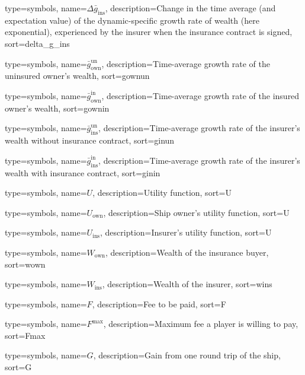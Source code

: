 {
 type={symbols}, 
 name={\ensuremath{\Delta \bar{g}_{\text{ins}}}},
 description={Change in the time average (and expectation value) of the dynamic-specific growth rate of wealth (here exponential), experienced by the insurer when the insurance contract is signed},
 sort=delta_g_ins
}

{
  type={symbols}, 
  name={\ensuremath{\bar{g}_{\text{own}}^{\text{un}}}},
  description={Time-average growth rate of the uninsured owner's wealth},
  sort=gownun
}

{
  type={symbols}, 
  name={\ensuremath{\bar{g}_{\text{own}}^{\text{in}}}},
  description={Time-average growth rate of the insured owner's wealth},
  sort=gownin
}


{
  type={symbols}, 
  name={\ensuremath{\bar{g}_{\text{ins}}^{\text{un}}}},
  description={Time-average growth rate of the insurer's wealth without insurance contract},
  sort=ginun
}

{
  type={symbols}, 
  name={\ensuremath{\bar{g}_{\text{ins}}^{\text{in}}}},
  description={Time-average growth rate of the insurer's wealth with insurance contract},
  sort=ginin
}

{
  type={symbols}, 
  name={\ensuremath{U}},
  description={Utility function},
  sort=U
}

{
  type={symbols}, 
  name={\ensuremath{U_{\text{own}}}},
  description={Ship owner's utility function},
  sort=U
}

{
  type={symbols}, 
  name={\ensuremath{U_{\text{ins}}}},
  description={Insurer's utility function},
  sort=U
}

{
  type={symbols}, 
  name={\ensuremath{W_{\text{own}}}},
  description={Wealth of the insurance buyer},
  sort=wown
}

{
  type={symbols}, 
  name={\ensuremath{W_{\text{ins}}}},
  description={Wealth of the insurer},
  sort=wins
}


{
  type={symbols}, 
  name={\ensuremath{F}},
  description={Fee to be paid},
  sort=F
}

{
  type={symbols}, 
  name={\ensuremath{F^{\text{max}}}},
  description={Maximum fee a player is willing to pay},
  sort=Fmax
}


{
  type={symbols}, 
  name={\ensuremath{G}},
  description={Gain from one round trip of the ship},
  sort=G
}

